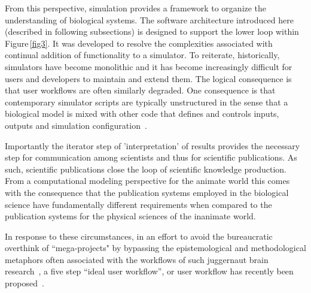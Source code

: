 \documentclass[10pt,letterpaper]{article}
\begin{document}
From this perspective, simulation provides a framework to organize the understanding of biological systems. The software architecture introduced here (described in following subsections) is designed to support the lower loop within Figure\,\ref{fig3}. It was developed to resolve the complexities associated with continual addition of functionality to a simulator. To reiterate, historically, simulators have become monolithic and it has become increasingly difficult for users and developers to maintain and extend them. The logical consequence is that user workflows are often similarly degraded. One consequence is that contemporary simulator scripts are typically unstructured in the sense that a biological model is mixed with other code that defines and controls inputs, outputs and simulation configuration~\cite{cannon07:_inter}.

Importantly the iterator step of 'interpretation' of results provides the necessary step for communication among scientists and thus for scientific publications.  As such, scientific publications close the loop of scientific knowledge production.  From a computational modeling perspective for the animate world this comes with the consequence that the publication systems employed in the biological science have fundamentally different requirements when compared to the publication systems for the physical sciences of the inanimate world.

In response to these circumstances, in an effort to avoid the bureaucratic overthink of ``mega-projects" by bypassing the epistemological and methodological metaphors often associated with the workflows of such juggernaut brain research~\cite{fan19}, a five step “ideal user workflow”, or user workflow has recently been proposed~\cite{cornelis12}.
\end{document}
